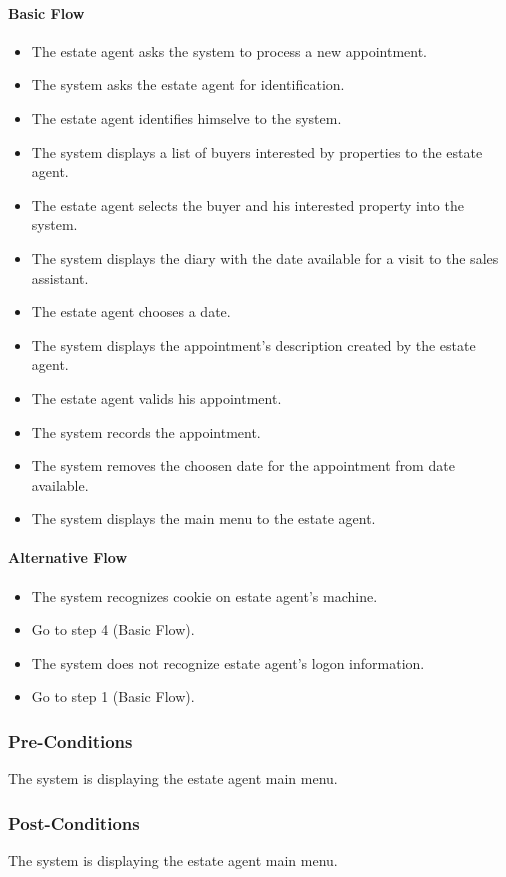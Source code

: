 \documentclass[a4paper,12pt]{article}
\begin{document}
\paragraph{Basic Flow}
\begin{itemize}
\item The estate agent asks the system to process a new appointment.
\item The system asks the estate agent for identification.
\item The estate agent identifies himselve to the system.
\item The system displays a list of buyers interested by properties to the estate agent.
\item The estate agent selects the buyer and his interested property into the system.
\item The system displays the diary with the date available for a visit to the sales assistant.
\item The estate agent chooses a date.
\item The system displays the appointment's description created by the estate agent.
\item The estate agent valids his appointment.
\item The system records the appointment.
\item The system removes the choosen date for the appointment from date available.
\item The system displays the main menu to the estate agent.
\end{itemize}
\paragraph{Alternative Flow}
\begin{itemize}
\item The system recognizes cookie on estate agent's machine. 
\item Go to step 4 (Basic Flow).
\item The system does not recognize estate agent's logon information.
\item Go to step 1 (Basic Flow).
\end{itemize}
\subsubsection{Pre-Conditions}
The system is displaying the estate agent main menu.
\subsubsection{Post-Conditions}
The system is displaying the estate agent main menu.
\end{document}
